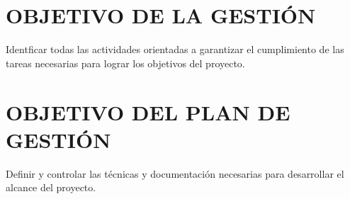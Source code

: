 \chapter{OBJETIVO DE LA GESTI\'ON}
Identficar todas las actividades orientadas a garantizar el cumplimiento de 
las tareas necesarias para lograr los objetivos del proyecto.%

\chapter{OBJETIVO DEL PLAN DE GESTI\'ON}
Definir y controlar las t\'ecnicas y documentaci\'on necesarias para desarrollar el alcance del proyecto.%